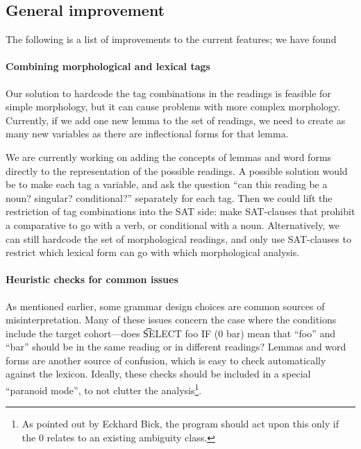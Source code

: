 {{\subsection{General improvement}

The following is a list of improvements to the current features; we have found 

\paragraph{Combining morphological and lexical tags}

Our solution to hardcode the tag combinations in the readings is
feasible for simple morphology, but it can cause problems with more
complex morphology.
Currently, if we add one new lemma to the set of readings, we need to
create as many new variables as there are inflectional forms
for that lemma. %

We are currently working on adding the concepts of lemmas and word
forms directly to the representation of the possible readings.
A possible solution would be to make each tag a variable, and ask the
question ``can this reading be a noun? singular? 
conditional?'' separately for each tag. Then we could lift the
restriction of tag combinations into the SAT side: make SAT-clauses
that prohibit a comparative to go with a verb, or conditional with a noun.
Alternatively, we can still hardcode the set of morphological readings, and 
only use SAT-clauses to restrict which lexical form can go with which morphological analysis.

\paragraph{Heuristic checks for common issues} 
As mentioned earlier, some grammar design choices  
are common sources of misinterpretation.
Many of these issues concern the case where the conditions include 
the target cohort---does \t{SELECT foo IF (0 bar)} mean that ``foo'' and ``bar'' 
should be in the same reading or in different readings? 
Lemmas and word forms are another source of confusion, which is easy to check automatically against the lexicon. 
Ideally, these checks should be included in a special ``paranoid mode'', to not clutter the analysis\footnote{As pointed out by Eckhard Bick, the program should act upon this only if the 0 relates to an existing ambiguity class.}.


}}
